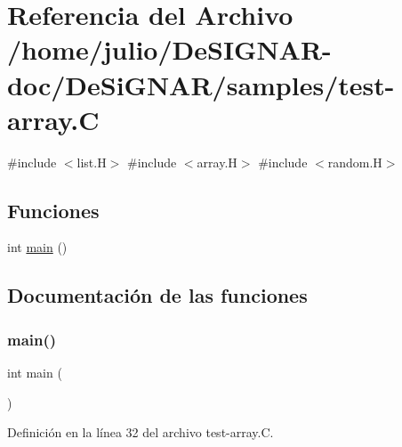 \hypertarget{test-array_8_c}{}\section{Referencia del Archivo /home/julio/\+De\+S\+I\+G\+N\+A\+R-\/doc/\+De\+Si\+G\+N\+A\+R/samples/test-\/array.C}
\label{test-array_8_c}
{\ttfamily \#include $<$list.\+H$>$}\newline
{\ttfamily \#include $<$array.\+H$>$}\newline
{\ttfamily \#include $<$random.\+H$>$}\newline
\subsection*{Funciones}
\begin{DoxyCompactItemize}
\item 
int \hyperlink{test-array_8_c_ae66f6b31b5ad750f1fe042a706a4e3d4}{main} ()
\end{DoxyCompactItemize}


\subsection{Documentación de las funciones}
\mbox{\label{test-array_8_c_ae66f6b31b5ad750f1fe042a706a4e3d4}} 
\subsubsection{\texorpdfstring{main()}{main()}}
{\footnotesize\ttfamily int main (\begin{DoxyParamCaption}{ }\end{DoxyParamCaption})}



Definición en la línea 32 del archivo test-\/array.\+C.

